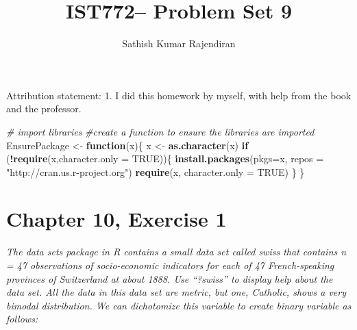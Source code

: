 \documentclass[]{article}
\title{IST772-- Problem Set 9}
\author{Sathish Kumar Rajendiran}
\date{}
\newenvironment{Shaded}{\begin{snugshade}}{\end{snugshade}}
\newcommand{\CommentTok}[1]{\textcolor[rgb]{0.56,0.35,0.01}{\textit{#1}}}
\newcommand{\ControlFlowTok}[1]{\textcolor[rgb]{0.13,0.29,0.53}{\textbf{#1}}}
\newcommand{\DataTypeTok}[1]{\textcolor[rgb]{0.13,0.29,0.53}{#1}}
\newcommand{\KeywordTok}[1]{\textcolor[rgb]{0.13,0.29,0.53}{\textbf{#1}}}
\newcommand{\NormalTok}[1]{#1}
\newcommand{\OperatorTok}[1]{\textcolor[rgb]{0.81,0.36,0.00}{\textbf{#1}}}
\newcommand{\OtherTok}[1]{\textcolor[rgb]{0.56,0.35,0.01}{#1}}
\newcommand{\StringTok}[1]{\textcolor[rgb]{0.31,0.60,0.02}{#1}}
\begin{document}
\maketitle

Attribution statement: 1. I did this homework by myself, with help from
the book and the professor.

\begin{Shaded}
\begin{Highlighting}[]
\CommentTok{# import libraries }
\CommentTok{#create a function to ensure the libraries are imported}
\NormalTok{EnsurePackage <-}\StringTok{ }\ControlFlowTok{function}\NormalTok{(x)\{}
\NormalTok{  x <-}\StringTok{ }\KeywordTok{as.character}\NormalTok{(x)}
    \ControlFlowTok{if}\NormalTok{ (}\OperatorTok{!}\KeywordTok{require}\NormalTok{(x,}\DataTypeTok{character.only =} \OtherTok{TRUE}\NormalTok{))\{}
      \KeywordTok{install.packages}\NormalTok{(}\DataTypeTok{pkgs=}\NormalTok{x, }\DataTypeTok{repos =} \StringTok{"http://cran.us.r-project.org"}\NormalTok{)}
      \KeywordTok{require}\NormalTok{(x, }\DataTypeTok{character.only =} \OtherTok{TRUE}\NormalTok{)}
\NormalTok{    \}}
\NormalTok{  \}}
\end{Highlighting}
\end{Shaded}

\hypertarget{chapter-10-exercise-1}{%
\section{Chapter 10, Exercise 1}\label{chapter-10-exercise-1}}

\emph{The data sets package in R contains a small data set called swiss
that contains n = 47 observations of socio-economic indicators for each
of 47 French-speaking provinces of Switzerland at about 1888. Use
``?swiss'' to display help about the data set. All the data in this data
set are metric, but one, Catholic, shows a very bimodal distribution. We
can dichotomize this variable to create binary variable as follows:}
\end{document}
